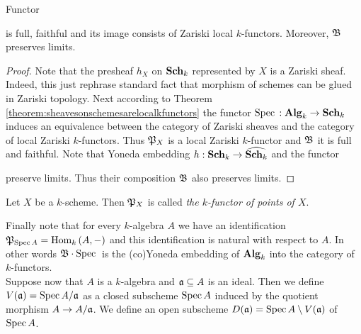 \begin{fact}\label{fact:functorsofpoints}
Functor
\begin{center}
\end{center}
is full, faithful and its image consists of Zariski local $k$-functors. Moreover, ${\mathfrak B}$ preserves limits.
\end{fact}
\begin{proof}
Note that the presheaf $h_X$ on $\mathbf{Sch}_k$ represented by $X$ is a Zariski sheaf. Indeed, this just rephrase standard fact that morphism of schemes can be glued in Zariski topology. Next according to Theorem \ref{theorem:sheavesonschemesarelocalkfunctors} the functor $\mathrm{Spec}\,:\mathbf{Alg}_k\rightarrow \mathbf{Sch}_k$ induces an equivalence between the category of Zariski sheaves and the category of local Zariski $k$-functors. Thus ${\mathfrak P}_X$ is a local Zariski $k$-functor and ${\mathfrak B}$ it is full and faithful. Note that Yoneda embedding $h:\mathbf{Sch}_k\rightarrow \widehat{\mathbf{Sch}_k}$ and the functor
\begin{center}
\end{center}
preserve limits. Thus their composition ${\mathfrak B}$ also preserves limits.
\end{proof}

\begin{definition}
Let $X$ be a $k$-scheme. Then ${\mathfrak P}_X$ is called \textit{the $k$-functor of points of $X$}.
\end{definition}
\noindent
Finally note that for every $k$-algebra $A$ we have an identification ${\mathfrak P}_{\mathrm{Spec}\, A} = \mathrm{Hom}_k\left(A,-\right)$ and this identification is natural with respect to $A$. In other words ${\mathfrak B}\cdot \mathrm{Spec}\,$ is the (co)Yoneda embedding of $\mathbf{Alg}_k$ into the category of $k$-functors.\\
Suppose now that $A$ is a $k$-algebra and $\mathfrak{a}\subseteq A$ is an ideal. Then we define $V(\mathfrak{a}) = \mathrm{Spec}\, A/\mathfrak{a}$ as a closed subscheme $\mathrm{Spec}\, A$ induced by the quotient morphism $A\rightarrow A/\mathfrak{a}$. We define an open subscheme $D(\mathfrak{a}) = \mathrm{Spec}\, A\setminus V(\mathfrak{a})$ of $\mathrm{Spec}\, A$.

